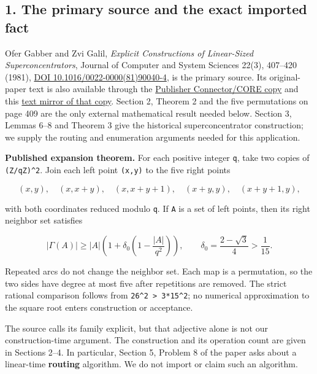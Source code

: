 \hypertarget{af-a1dc8f9b11-the-primary-source-and-the-exact-imported-fact}{%
\subsection{1. The primary source and the exact imported fact}\label{af-a1dc8f9b11-the-primary-source-and-the-exact-imported-fact}}

Ofer Gabber and Zvi Galil, \emph{Explicit Constructions of Linear-Sized Superconcentrators}, Journal of Computer and System Sciences 22(3), 407--420 (1981), \href{https://doi.org/10.1016/0022-0000(81)90040-4}{DOI 10.1016/0022-0000(81)90040-4}, is the primary source. Its original-paper text is also available through the \href{https://core.ac.uk/download/pdf/82074011.pdf}{Publisher Connector/CORE copy} and this \href{https://www.academia.edu/130175693/Explicit_constructions_of_linear_sized_superconcentrators}{text mirror of that copy}. Section 2, Theorem 2 and the five permutations on page 409 are the only external mathematical result needed below. Section 3, Lemmas 6--8 and Theorem 3 give the historical superconcentrator construction; we supply the routing and enumeration arguments needed for this application.

\textbf{Published expansion theorem.} For each positive integer \texttt{q}, take two copies of \texttt{(Z/qZ)\^{}2}. Join each left point \texttt{(x,y)} to the five right points

\[
(x,y),\quad(x,x+y),\quad(x,x+y+1),\quad
(x+y,y),\quad(x+y+1,y),
\]

with both coordinates reduced modulo \texttt{q}. If \texttt{A} is a set of left points, then its right neighbor set satisfies

\[
|\Gamma(A)|\ge |A|\left(1+\delta_0
  \left(1-\frac{|A|}{q^2}\right)\right),
\qquad \delta_0=\frac{2-\sqrt3}{4}>\frac1{15}.
\]

Repeated arcs do not change the neighbor set. Each map is a permutation, so the two sides have degree at most five after repetitions are removed. The strict rational comparison follows from \texttt{26\^{}2\ \textgreater{}\ 3*15\^{}2}; no numerical approximation to the square root enters construction or acceptance.

The source calls its family explicit, but that adjective alone is not our construction-time argument. The construction and its operation count are given in Sections 2--4. In particular, Section 5, Problem 8 of the paper asks about a linear-time \textbf{routing} algorithm. We do not import or claim such an algorithm.

